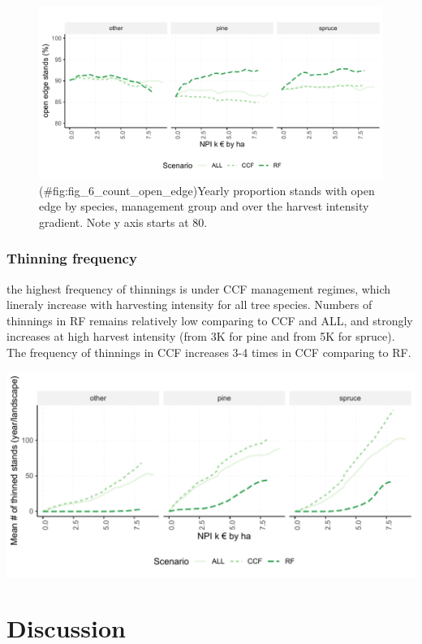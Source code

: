 \documentclass[]{elsarticle} %
\makeatletter
\def\maxwidth{\ifdim\Gin@nat@width>\linewidth\linewidth
\else\Gin@nat@width\fi}
\let\Oldincludegraphics\includegraphics
\renewcommand{\includegraphics}[1]{\Oldincludegraphics[width=\maxwidth]{#1}}
\makeatother
\begin{document}
\begin{figure}
\centering
\includegraphics{test_manus_files/figure-latex/fig_6_count_open_edge-1.pdf}
\caption{(\#fig:fig\_6\_count\_open\_edge)Yearly proportion stands with open edge by species, management group and over the harvest intensity gradient. Note y axis starts at 80.}
\end{figure}

\hypertarget{thinning-frequency}{%
\subsubsection{Thinning frequency}\label{thinning-frequency}}

the highest frequency of thinnings is under CCF management regimes, which lineraly increase with harvesting intensity for all tree species. Numbers of thinnings in RF remains relatively low comparing to CCF and ALL, and strongly increases at high harvest intensity (from 3K for pine and from 5K for spruce). The frequency of thinnings in CCF increases 3-4 times in CCF comparing to RF.

\includegraphics{test_manus_files/figure-latex/unnamed-chunk-2-1.pdf}

\hypertarget{discussion}{%
\section{Discussion}\label{discussion}}
\end{document}
